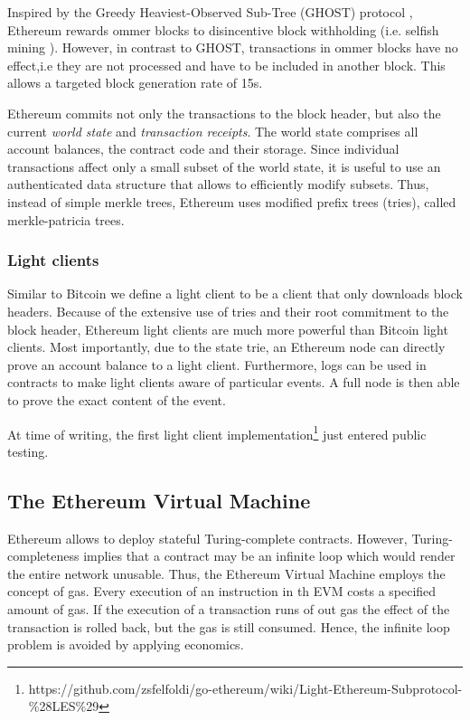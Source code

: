 Inspired by the Greedy Heaviest-Observed Sub-Tree (GHOST) protocol \parencite{cryptoeprint:2013:881}, Ethereum rewards ommer blocks to disincentive block withholding (i.e. selfish mining \parencite{Eyal2014}). However, in contrast to GHOST, transactions in ommer blocks have no effect,i.e they are not processed and have to be included in another block. This allows a targeted block generation rate of 15s.  

Ethereum commits not only the transactions to the block header, but also the current \emph{world state} and \emph{transaction receipts}. The world state comprises all account balances, the contract code and their storage. Since individual transactions affect only a small subset of the world state, it is useful to use an authenticated data structure that allows to efficiently modify subsets. Thus, instead of simple merkle trees, Ethereum uses modified prefix trees (tries), called merkle-patricia trees.

\subsubsection{Light clients}

Similar to Bitcoin we define a light client to be a client that only downloads block headers. Because of the extensive use of tries and their root commitment to the block header, Ethereum light clients are much more powerful than Bitcoin light clients. 
Most importantly, due to the state trie, an Ethereum node can directly prove an account balance to a light client. Furthermore, logs can be used in contracts to make light clients aware of particular events. A full node is then able to prove the exact content of the event.

At time of writing, the first light client implementation\footnote{https://github.com/zsfelfoldi/go-ethereum/wiki/Light-Ethereum-Subprotocol-\%28LES\%29} just entered public testing.

\subsection{The Ethereum Virtual Machine}

Ethereum allows to deploy stateful Turing-complete contracts. However, Turing-completeness implies that a contract may be an infinite loop which would render the entire network unusable. Thus, the Ethereum Virtual Machine employs the concept of gas. Every execution of an instruction in th EVM costs a specified amount of gas. If the execution of a transaction runs of out gas the effect of the transaction is rolled back, but the gas is still consumed. Hence, the infinite loop problem is avoided by applying economics.

